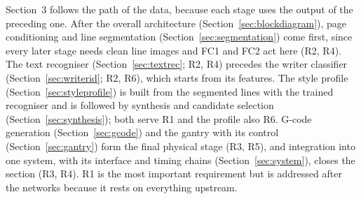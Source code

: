 Section~3 follows the path of the data, because each stage uses the output of the preceding one. After the overall architecture (Section~\ref{sec:blockdiagram}), page conditioning and line segmentation (Section~\ref{sec:segmentation}) come first, since every later stage needs clean line images and FC1 and FC2 act here (R2, R4). The text recogniser (Section~\ref{sec:textrec}; R2, R4) precedes the writer classifier (Section~\ref{sec:writerid}; R2, R6), which starts from its features. The style profile (Section~\ref{sec:styleprofile}) is built from the segmented lines with the trained recogniser and is followed by synthesis and candidate selection (Section~\ref{sec:synthesis}); both serve R1 and the profile also R6. G-code generation (Section~\ref{sec:gcode}) and the gantry with its control (Section~\ref{sec:gantry}) form the final physical stage (R3, R5), and integration into one system, with its interface and timing chains (Section~\ref{sec:system}), closes the section (R3, R4). R1 is the most important requirement but is addressed after the networks because it rests on everything upstream.
